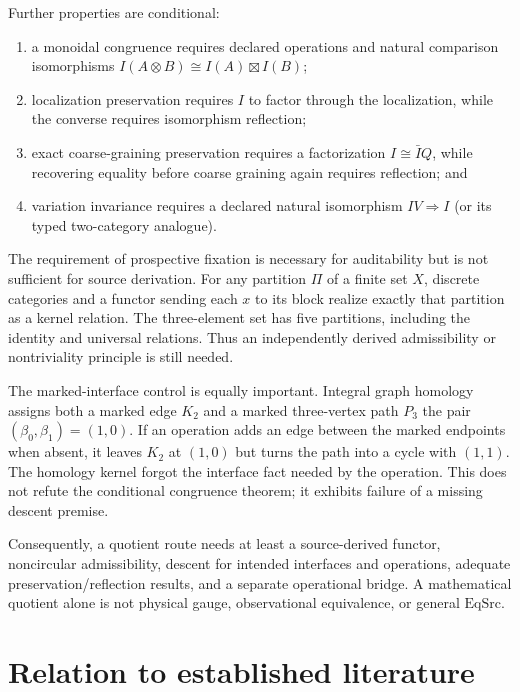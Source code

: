 \documentclass[11pt]{article}
\theoremstyle{definition}
\begin{document}
Further properties are conditional:
\begin{enumerate}
  \item a monoidal congruence requires declared operations and natural
        comparison isomorphisms
        \(I(A\otimes B)\cong I(A)\boxtimes I(B)\);
  \item localization preservation requires \(I\) to factor through the
        localization, while the converse requires isomorphism reflection;
  \item exact coarse-graining preservation requires a factorization
        \(I\cong\bar I Q\), while recovering equality before coarse graining
        again requires reflection; and
  \item variation invariance requires a declared natural isomorphism
        \(IV\Rightarrow I\) (or its typed two-category analogue).
\end{enumerate}

The requirement of prospective fixation is necessary for auditability but is
not sufficient for source derivation.  For any partition \(\Pi\) of a finite
set \(X\), discrete
categories and a functor sending each \(x\) to its block realize exactly that
partition as a kernel relation.  The three-element set has five partitions,
including the identity and universal relations.  Thus an independently
derived admissibility or nontriviality principle is still needed.

The marked-interface control is equally important.  Integral graph homology
assigns both a marked edge \(K_2\) and a marked three-vertex path \(P_3\) the
pair \((\beta_0,\beta_1)=(1,0)\).  If an operation adds an edge between the
marked endpoints when absent, it leaves \(K_2\) at \((1,0)\) but turns the
path into a cycle with \((1,1)\).  The homology kernel forgot the interface
fact needed by the operation.  This does not refute the conditional
congruence theorem; it exhibits failure of a missing descent premise.

Consequently, a quotient route needs at least a source-derived functor,
noncircular admissibility, descent for intended interfaces and operations,
adequate preservation/reflection results, and a separate operational bridge.
A mathematical quotient alone is not physical gauge, observational
equivalence, or general \(\mathrm{EqSrc}\).

\section{Relation to established literature}
\end{document}

